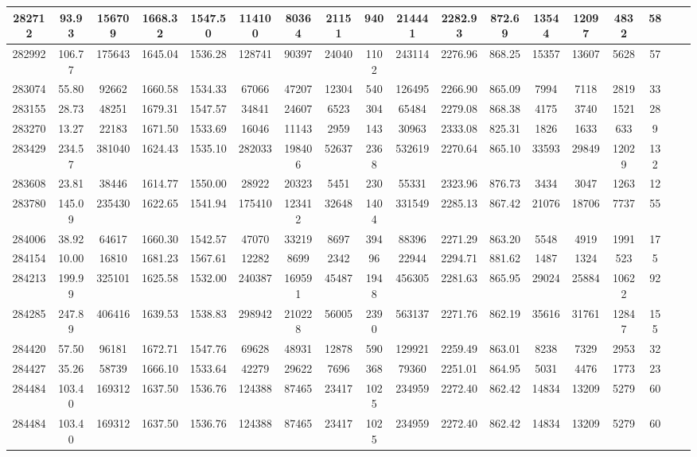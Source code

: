 \documentclass[10pt]{extarticle}
\begin{document}
\begin{longtable}{|c|c|c|c|c|c|c|c|c|c|c|c|c|c|c|c|c|c|}
\hline 
282712&93.93&156709&1668.32&1547.50&114100&80364&21151&940&214441&2282.93&872.69&13544&12097&4832&58 \\ 
\hline 
282992&106.77&175643&1645.04&1536.28&128741&90397&24040&1102&243114&2276.96&868.25&15357&13607&5628&57 \\ 
\hline 
283074&55.80&92662&1660.58&1534.33&67066&47207&12304&540&126495&2266.90&865.09&7994&7118&2819&33 \\ 
\hline 
283155&28.73&48251&1679.31&1547.57&34841&24607&6523&304&65484&2279.08&868.38&4175&3740&1521&28 \\ 
\hline 
283270&13.27&22183&1671.50&1533.69&16046&11143&2959&143&30963&2333.08&825.31&1826&1633&633&9 \\ 
\hline 
283429&234.57&381040&1624.43&1535.10&282033&198406&52637&2368&532619&2270.64&865.10&33593&29849&12029&132 \\ 
\hline 
283608&23.81&38446&1614.77&1550.00&28922&20323&5451&230&55331&2323.96&876.73&3434&3047&1263&12 \\ 
\hline 
283780&145.09&235430&1622.65&1541.94&175410&123412&32648&1404&331549&2285.13&867.42&21076&18706&7737&55 \\ 
\hline 
284006&38.92&64617&1660.30&1542.57&47070&33219&8697&394&88396&2271.29&863.20&5548&4919&1991&17 \\ 
\hline 
284154&10.00&16810&1681.23&1567.61&12282&8699&2342&96&22944&2294.71&881.62&1487&1324&523&5 \\ 
\hline 
284213&199.99&325101&1625.58&1532.00&240387&169591&45487&1948&456305&2281.63&865.95&29024&25884&10622&92 \\ 
\hline 
284285&247.89&406416&1639.53&1538.83&298942&210228&56005&2390&563137&2271.76&862.19&35616&31761&12847&155 \\ 
\hline 
284420&57.50&96181&1672.71&1547.76&69628&48931&12878&590&129921&2259.49&863.01&8238&7329&2953&32 \\ 
\hline 
284427&35.26&58739&1666.10&1533.64&42279&29622&7696&368&79360&2251.01&864.95&5031&4476&1773&23 \\ 
\hline 
284484&103.40&169312&1637.50&1536.76&124388&87465&23417&1025&234959&2272.40&862.42&14834&13209&5279&60 \\ 
\hline 
284484&103.40&169312&1637.50&1536.76&124388&87465&23417&1025&234959&2272.40&862.42&14834&13209&5279&60 \\ 
\hline 
\end{longtable} 
\end{document}
